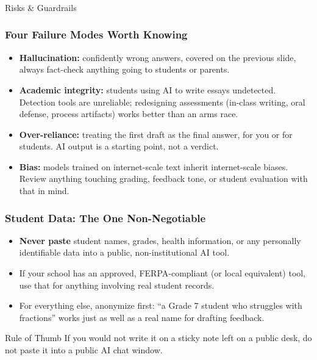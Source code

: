 \begin{frame}[fragile]\frametitle{}
\begin{center}
{\Large Risks \& Guardrails}
\end{center}
\end{frame}

\begin{frame}[fragile]\frametitle{Four Failure Modes Worth Knowing}
\begin{itemize}
\item \textbf{Hallucination:} confidently wrong answers, covered on the previous slide, always fact-check anything going to students or parents.
\item \textbf{Academic integrity:} students using AI to write essays undetected. Detection tools are unreliable; redesigning assessments (in-class writing, oral defense, process artifacts) works better than an arms race.
\item \textbf{Over-reliance:} treating the first draft as the final answer, for you or for students. AI output is a starting point, not a verdict.
\item \textbf{Bias:} models trained on internet-scale text inherit internet-scale biases. Review anything touching grading, feedback tone, or student evaluation with that in mind.
\end{itemize}
\end{frame}

\begin{frame}[fragile]\frametitle{Student Data: The One Non-Negotiable}
\begin{itemize}
\item \textbf{Never paste} student names, grades, health information, or any personally identifiable data into a public, non-institutional AI tool.
\item If your school has an approved, FERPA-compliant (or local equivalent) tool, use that for anything involving real student records.
\item For everything else, anonymize first: ``a Grade 7 student who struggles with fractions'' works just as well as a real name for drafting feedback.
\end{itemize}
\begin{alertblock}{Rule of Thumb}
If you would not write it on a sticky note left on a public desk, do not paste it into a public AI chat window.
\end{alertblock}
\end{frame}

